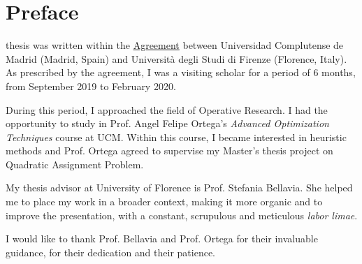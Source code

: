 \chapter{Preface}
 thesis was written within the \href{https://www.scienze.unifi.it/upload/sub/convenzione-complutense-testo-firmato.pdf}{Agreement} between Universidad Complutense de Madrid (Madrid, Spain) and Università degli Studi di Firenze (Florence, Italy). As prescribed by the agreement, I was a visiting scholar for a period of 6 months, from September 2019 to February 2020. 

During this period, I approached the field of Operative Research. I had the opportunity to study in Prof. Angel Felipe Ortega's \emph{Advanced Optimization Techniques} course at UCM. Within this course, I became interested in heuristic methods  and Prof. Ortega agreed to supervise my Master's thesis project on Quadratic Assignment Problem.
 
My thesis advisor at University of Florence is Prof. Stefania Bellavia. She helped me to place my work in a broader context, making it more organic and to improve the presentation, with a constant, scrupulous and meticulous \textit{labor limae}.


I would like to thank Prof. Bellavia and Prof. Ortega for their invaluable guidance, for their dedication and their patience.






